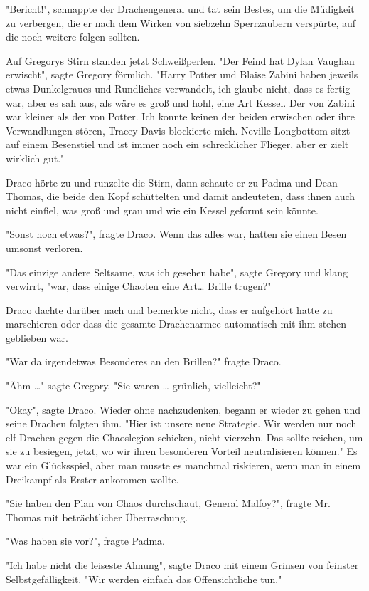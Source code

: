 {"Bericht!", schnappte der Drachengeneral und tat sein Bestes, um die Müdigkeit zu verbergen, die er nach dem Wirken von siebzehn Sperrzaubern verspürte, auf die noch weitere folgen sollten.

Auf Gregorys Stirn standen jetzt Schweißperlen. "Der Feind hat Dylan Vaughan erwischt", sagte Gregory förmlich. "Harry Potter und Blaise Zabini haben jeweils etwas Dunkelgraues und Rundliches verwandelt, ich glaube nicht, dass es fertig war, aber es sah aus, als wäre es groß und hohl, eine Art Kessel. Der von Zabini war kleiner als der von Potter. Ich konnte keinen der beiden erwischen oder ihre Verwandlungen stören, Tracey Davis blockierte mich. Neville Longbottom sitzt auf einem Besenstiel und ist immer noch ein schrecklicher Flieger, aber er zielt wirklich gut."

Draco hörte zu und runzelte die Stirn, dann schaute er zu Padma und Dean Thomas, die beide den Kopf schüttelten und damit andeuteten, dass ihnen auch nicht einfiel, was groß und grau und wie ein Kessel geformt sein könnte.

"Sonst noch etwas?", fragte Draco. Wenn das alles war, hatten sie einen Besen umsonst verloren.

"Das einzige andere Seltsame, was ich gesehen habe", sagte Gregory und klang verwirrt, "war, dass einige Chaoten eine Art… Brille trugen?"

Draco dachte darüber nach und bemerkte nicht, dass er aufgehört hatte zu marschieren oder dass die gesamte Drachenarmee automatisch mit ihm stehen geblieben war.

"War da irgendetwas Besonderes an den Brillen?" fragte Draco.

"Ähm …" sagte Gregory. "Sie waren … grünlich, vielleicht?"

"Okay", sagte Draco. Wieder ohne nachzudenken, begann er wieder zu gehen und seine Drachen folgten ihm. "Hier ist unsere neue Strategie. Wir werden nur noch elf Drachen gegen die Chaoslegion schicken, nicht vierzehn. Das sollte reichen, um sie zu besiegen, jetzt, wo wir ihren besonderen Vorteil neutralisieren können." Es war ein Glücksspiel, aber man musste es manchmal riskieren, wenn man in einem Dreikampf als Erster ankommen wollte.

"Sie haben den Plan von Chaos durchschaut, General Malfoy?", fragte Mr. Thomas mit beträchtlicher Überraschung.

"Was haben sie vor?", fragte Padma.

"Ich habe nicht die leiseste Ahnung", sagte Draco mit einem Grinsen von feinster Selbstgefälligkeit. "Wir werden einfach das Offensichtliche tun."

}
